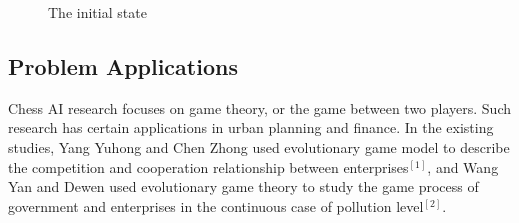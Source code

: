 \documentclass[conference,compsoc]{IEEEtran}
\begin{document}
\begin{figure}[h]
\begin{center}
\end{center}
\caption{The initial state}
\label{Fig1}
\end{figure}

\subsection{Problem Applications}
Chess AI research focuses on game theory, or the game between two players. Such research has certain applications in urban planning and finance. In the existing studies, Yang Yuhong and Chen Zhong used evolutionary game model to describe the competition and cooperation relationship between enterprises$^{[1]}$, and Wang Yan and Dewen used evolutionary game theory to study the game process of government and enterprises in the continuous case of pollution level$^{[2]}$.

%
%

\end{document}
